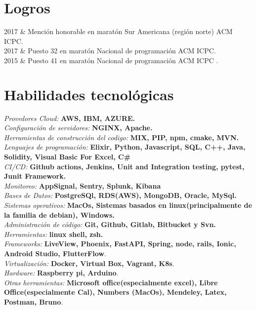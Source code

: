 \documentclass[
    changecolor={111, 156, 45}, 
]{cv-roald}
\begin{document}
\section*{Logros}
\begin{tabularcv}	
2017    &   Mención honorable en maratón Sur Americana (región norte) ACM ICPC. \\
2017	&	Puesto 32 en maratón Nacional de programación ACM ICPC.  \\
2015    &   Puesto 41 en maratón Nacional de programación ACM ICPC  .  \\

                
\end{tabularcv}

\section*{Habilidades tecnológicas}
    \textit{Provedores Cloud:} \textbf{AWS, IBM, AZURE.}\\
    \textit{Configuración de servidores:} \textbf{NGINX, Apache.}\\
    \textit{Herramientas de construcción del codigo:}  \textbf{MIX, PIP, npm, cmake, MVN.}\\
	\textit{Lenguajes de programación:}  \textbf{Elixir, Python, Javascript, SQL, C++, Java, Solidity, Visual Basic For Excel, C\#}\\
	\textit{CI/CD:} \textbf{Github actions, Jenkins, Unit and Integration testing, pytest, Junit Framework.}\\
    \textit{Monitoreo:} \textbf{AppSignal, Sentry, Splunk, Kibana}\\
	\textit{Bases de Datos:} \textbf{PostgreSQl, RDS(AWS),  MongoDB, Oracle, MySql.}\\ 
	\textit{Sistemas operativos:} \textbf{MacOs, Sistemas basados en linux(principalmente de la familia de debian), Windows.}\\
	\textit{Administración de código: } \textbf{Git, Github, Gitlab, Bitbucket y Svn.}\\
	\textit{Herramientas:} \textbf{linux shell, zsh.}\\
	\textit{Frameworks:} \textbf{LiveView, Phoenix, FastAPI, Spring, node, rails, Ionic, Android Studio, FlutterFlow}. \\
	\textit{Virtualización:} \textbf{Docker, Virtual Box, Vagrant, K8s}.\\
	\textit{Hardware:} \textbf{Raspberry pi, Arduino}.\\
	\textit{Otras herramientas:} \textbf{Microsoft office(especialmente excel), Libre Office(especialmente Cal), Numbers (MacOs), Mendeley, Latex, Postman, Bruno}.
\end{document}
